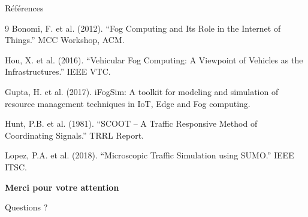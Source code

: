 \documentclass[10pt,aspectratio=169]{beamer}
\begin{document}
\begin{frame}{R\'ef\'erences}
\footnotesize
\begin{thebibliography}{9}
 Bonomi, F. et al. (2012). ``Fog Computing and Its Role in the Internet of Things.'' MCC Workshop, ACM.

 Hou, X. et al. (2016). ``Vehicular Fog Computing: A Viewpoint of Vehicles as the Infrastructures.'' IEEE VTC.

 Gupta, H. et al. (2017). iFogSim: A toolkit for modeling and simulation of resource management techniques in IoT, Edge and Fog computing.

 Hunt, P.B. et al. (1981). ``SCOOT -- A Traffic Responsive Method of Coordinating Signals.'' TRRL Report.

 Lopez, P.A. et al. (2018). ``Microscopic Traffic Simulation using SUMO.'' IEEE ITSC.
\end{thebibliography}
\end{frame}

\begin{frame}
\centering
\Huge\textbf{Merci pour votre attention}

\vspace{1cm}
\Large Questions ?
\end{frame}
\end{document}

